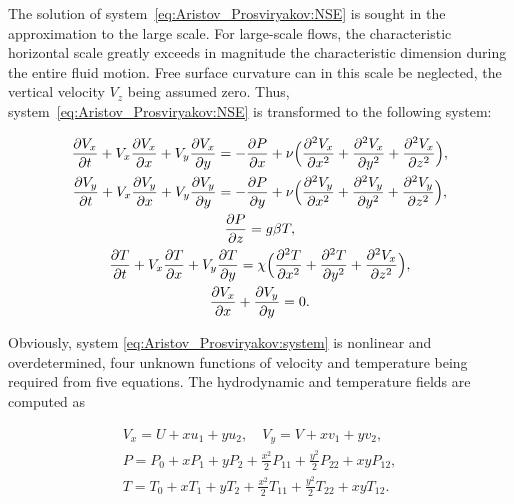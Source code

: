 The solution of system~\eqref{eq:Aristov_Prosviryakov:NSE} is sought in the approximation to the large scale. For large-scale flows, the characteristic horizontal scale greatly exceeds in magnitude the characteristic dimension during the entire fluid motion. Free surface curvature can in this scale be neglected, the vertical velocity $V_z$  being assumed zero. Thus, system~\eqref{eq:Aristov_Prosviryakov:NSE} is transformed to the following system:

\begin{gather}

\frac{\partial V_x}{\partial t}+V_x \frac{\partial V_x}{\partial x}+V_y \frac{\partial V_x}{\partial y}=-\frac{\partial P}{\partial x} + \nu \Bigl(\frac{\partial^2 V_x}{\partial x^2}+\frac{\partial^2 V_x}{\partial y^2}+\frac{\partial^2 V_x}{\partial z^2}\Bigr),

\\       

\frac{\partial V_y}{\partial t}+V_x \frac{\partial V_y}{\partial x}+V_y \frac{\partial V_y}{\partial y}=-\frac{\partial P}{\partial y} + \nu \Bigl(\frac{\partial^2 V_y}{\partial x^2}+\frac{\partial^2 V_y}{\partial y^2}+\frac{\partial^2 V_y}{\partial z^2}\Bigr),

\\

       \label{eq:Aristov_Prosviryakov:system}

\frac{\partial P}{\partial z}=g\beta T,

\\

\frac{\partial T}{\partial t}+V_x \frac{\partial T}{\partial x}+V_y \frac{\partial T}{\partial y}=\chi \Bigl(\frac{\partial^2 T}{\partial x^2}+\frac{\partial^2 T}{\partial y^2}+\frac{\partial^2 V_x}{\partial z^2}\Bigr),

\\

\frac{\partial V_x}{\partial x}+\frac{\partial V_y}{\partial y}=0.

 \end{gather}

 

Obviously, system \eqref{eq:Aristov_Prosviryakov:system} is nonlinear and overdetermined, four unknown functions of velocity and temperature being required from five equations. The hydrodynamic and temperature fields are computed as~\cite{ulg:bib:Aristov1}

\begin{gather}

V_x=U+xu_1+y u_2,

\quad 

V_y=V+xv_1+y v_2,

\\

       \label{eq:Aristov_Prosviryakov:solution}

P=P_0+xP_1+yP_2+\frac{x^2}{2}P_{11}+\frac{y^2}{2}P_{22}+xyP_{12},

\\

T=T_0+xT_1+yT_2+\frac{x^2}{2}T_{11}+\frac{y^2}{2}T_{22}+xyT_{12}.     

 \end{gather}

